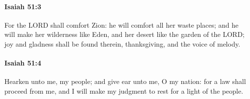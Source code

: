 		\paragraph{Isaiah 51:3} %
			\label{ISAIAH-51-3}

			For the LORD shall comfort Zion: he will comfort all her waste places; and he will make her wilderness like Eden, and her desert like the garden of the LORD; joy and gladness shall be found therein, thanksgiving, and the voice of melody.


		\paragraph{Isaiah 51:4} %
			\label{ISAIAH-51-4}

			Hearken unto me, my people; and give ear unto me, O my nation: for a law shall proceed from me, and I will make my judgment to rest for a light of the people.

